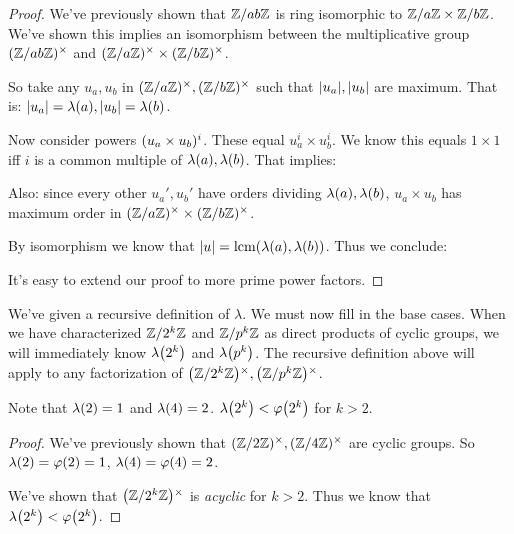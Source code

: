 \begin{proof}
  We've previously shown that $\Zmod{ab}$ is ring isomorphic to
  $\Zmod{a} \times \Zmod{b}$. We've shown this implies an isomorphism
  between the multiplicative group $\Zmodx{ab}$ and $\Zmodax \times
  \Zmodbx$.

  So take any $u_a, u_b$ in $\Zmodax, \Zmodbx$ such that $\order{u_a},
  \order{u_b}$ are maximum. That is: $\order{u_a} = \lambdaf{a},
  \order{u_b} = \lambdaf{b}$.

  Now consider powers $\parens{u_a \times u_b}^i$. These equal $u_a^i
  \times u_b^i$. We know this equals $1 \times 1$ iff $i$ is a common
  multiple of $\lambdaf{a}, \lambdaf{b}$. That implies:

  \begin{nedqn}
  \eqcol
  \end{nedqn}

  Also: since every other $u_a', u_b'$ have orders dividing
  $\lambdaf{a}, \lambdaf{b}$, $u_a \times u_b$ has maximum order in
  $\Zmodax \times \Zmodbx$.

  By isomorphism we know that $\order{u} = \lcmf{\lambdaf{a},
  \lambdaf{b}}$. Thus we conclude:

  \begin{nedqn}
  \eqcol
  \end{nedqn}

  It's easy to extend our proof to more prime power factors.
\end{proof}

\begin{remark}
  We've given a recursive definition of $\lambda$. We must now fill in
  the base cases. When we have characterized $\Zmod{2^k}$ and
  $\Zmod{p^k}$ as direct products of cyclic groups, we will immediately
  know $\lambdaf{2^k}$ and $\lambdaf{p^k}$. The recursive definition
  above will apply to any factorization of $\Zmodx{2^k}, \Zmodx{p^k}$.
\end{remark}

\begin{proposition}
  Note that $\lambdaf{2} = 1$ and $\lambdaf{4} = 2$. $\lambdaf{2^k} <
  \vphif{2^k}$ for $k > 2$.
\end{proposition}

\begin{proof}
  We've previously shown that $\Zmodx{2}, \Zmodx{4}$ are cyclic groups.
  So $\lambdaf{2} = \vphif{2} = 1$, $\lambdaf{4} = \vphif{4} = 2$.

  We've shown that $\Zmodx{2^k}$ is \emph{acyclic} for $k > 2$. Thus we
  know that $\lambdaf{2^k} < \vphif{2^k}$.
\end{proof}

